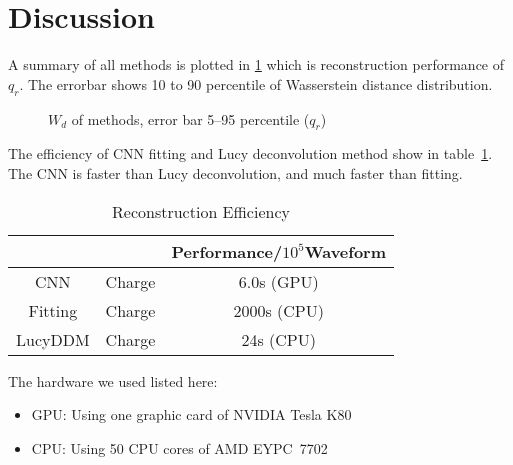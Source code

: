 \section{Discussion} %
\label{sec:discussion}

A summary of all methods is plotted in \ref{fig:chargesummary} which is reconstruction performance of $q_{r}$. The errorbar shows 10 to 90 percentile of Wasserstein distance distribution. 

\begin{figure}[H]
    \centering
    \scalebox{0.35}{}
    \caption{\label{fig:chargesummary} $W_{d}$ of methods, error bar 5--95 percentile ($q_{r}$)}
\end{figure}

The efficiency of CNN fitting and Lucy deconvolution method show in table~\ref{fig:efficiency}. The CNN is faster than Lucy deconvolution, and much faster than fitting. 

\begin{table}[H]
    \centering
    \caption{\label{fig:efficiency} Reconstruction Efficiency}
    \begin{tabular}{c|c|c}
        \hline
        & & Performance/$10^{5}$Waveform \\
        \hline
        CNN & Charge & 6.0s (GPU) \\
        \hline
        Fitting & Charge & 2000s (CPU) \\
        \hline
        LucyDDM & Charge & 24s (CPU) \\
        \hline
    \end{tabular}
\end{table}
\hspace{4mm}

The hardware we used listed here: 
\begin{center}
\begin{itemize}
    \item GPU: Using one graphic card of NVIDIA\textsuperscript{\textregistered} Tesla\textsuperscript{\textregistered} K80
    \item CPU: Using 50 CPU cores of AMD EYPC\texttrademark\ 7702
\end{itemize}
\end{center}

